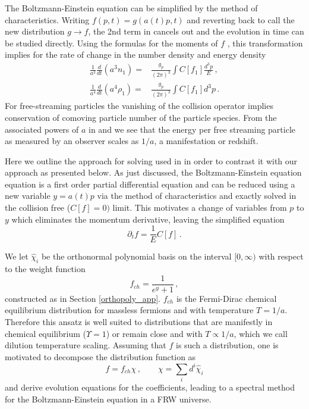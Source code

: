 The Boltzmann-Einstein equation  can be simplified by the method of characteristics. Writing $f(p, t)=g(a(t)p,t)$ and reverting back to call the new distribution $g\to f$, the 2nd term in  cancels out and the evolution in time can be studied directly.  Using the formulas for the moments of $f$ , this transformation implies for the rate of change in the   number density and energy density  
\begin{align}\label{n:div}
\frac{1}{a^3}\frac{d}{dt}(a^3n_1)=&\frac{g_p}{(2\pi)^3}\int C[f_1] \frac{d^3p}{E}\,,\\
\label{rho:div}
\frac{1}{a^4}\frac{d}{dt}(a^4\rho_1)=&\frac{g_p}{(2\pi)^3}\int C[f_1] d^3p \,.
\end{align} 
For free-streaming particles the vanishing of the collision operator implies conservation of comoving particle number of the particle species. From the associated powers of $a$ in  and  we see that the energy per free streaming particle as measured by an observer scales as $1/a$, a manifestation or redshift.


Here we outline the approach for solving  used in \cite{Esposito:2000hi,Mangano:2001iu} in order to contrast it with our approach as presented below.  As just discussed, the Boltzmann-Einstein equation equation  is a first order partial differential equation and can be reduced using a new variable $y=a(t)p$  via the method of characteristics and exactly solved in the collision free ($C[f]=0)$ limit.   This motivates a change of variables from $p$ to $y$ which eliminates the momentum derivative, leaving the simplified equation
\begin{equation}\label{a_vars}
\partial_tf=\frac{1}{E} C[f]\,.
\end{equation}

We let $\hat\chi_i$ be the orthonormal polynomial basis on the interval $[0,\infty)$ with respect to the weight function
\begin{equation}\label{free_stream_weight}
f_{ch}=\frac{1}{e^y+1}\,,
\end{equation}
constructed as in Section \ref{orthopoly_app}. $f_{ch}$ is the Fermi-Dirac chemical equilibrium distribution for massless fermions and with temperature $T=1/a$.  Therefore this ansatz is well suited to distributions that are manifestly in chemical equilibrium ($\Upsilon=1$) or remain close and with $T\propto 1/a$, which we call dilution temperature scaling.  Assuming that $f$ is such a distribution, one is   motivated to decompose the distribution function as
\begin{equation}\label{free_stream_ansatz}
f=f_{ch}\chi\,,\qquad \chi=\sum_i d^i\hat\chi_i
\end{equation}
and derive evolution equations for the coefficients, leading to a spectral method for the Boltzmann-Einstein equation in a FRW universe.

